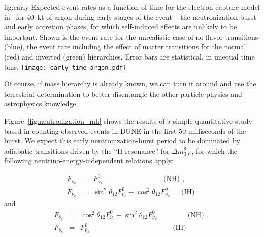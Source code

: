 \begin{dunefigure}{fig:early}
{Expected event rates as a function of time for the electron-capture model in~\cite{Huedepohl:2009wh} for \SI{40}{kt} of argon during early stages of the event -- the neutronization burst and early accretion phases, for which self-induced effects are unlikely to be important.  Shown is the event rate for the unrealistic case of no flavor transitions (blue), the event rate including the effect of matter transitions for the normal (red)  and inverted (green) hierarchies.  Error bars are statistical, in unequal time bins.}
\texttt{[image: early\_time\_argon.pdf]}
\end{dunefigure}

Of course, if mass hierarchy is already known, we can turn it around 
and use the terrestrial determination to better disentangle the other 
particle physics and astrophysics knowledge. 




Figure~\ref{fig:neutronization_mh} shows the results of a simple quantitative study
based in counting observed events in DUNE in the first 50 milliseconds
of the burst.  We expect this early neutronization-burst period to be
dominated by adiabatic  transitions driven by the ``H-resonance''
for $\Delta m^2_{3\ell}$, for which the following
neutrino-energy-independent relations apply:

\begin{eqnarray}  
 F_{\nu_e} &=& F^0_{\nu_x} \,\ \,\ \,\ \,\ \,\ \,\ \,\ \,\  \,\ \,\ \,\ \,\   \,\ \,\  \,\ \,\ \,\ \,\ \,\ \,\  \,\ \,\ \textrm{(NH)} \,\ , \label{eq:msw_nmo}\\
 F_{\nu_e} &=&  \sin^2 \theta_{12} F^0_{\nu_e} +
\cos^2 \theta_{12} F^0_{\nu_x}  \,\ \,\ \,\ \,\ \textrm{(IH)} \,\,
\label{eq:msw_imo}
\end{eqnarray} 
 and 
\begin{eqnarray}  
 F_{\bar\nu_e} &=& \cos^2 \theta_{12} F^0_{\bar\nu_e} + \sin^2 \theta_{12} F^0_{\bar\nu_x}   \,\   \,\ \,\  \,\ \,\ \,\ \,\ \,\ \,\  \,\ \,\ \textrm{(NH)} \,\ , \label{eq:msw_nmo_anti}\\
 F_{\bar\nu_e} &=&   F^0_{\bar\nu_x}  \,\ \,\ \,\ \,\ \,\ \,\ \,\ \,\ \,\ \,\ \,\ \,\ \,\ \,\ \,\ \,\ 
 \,\ \,\ \,\ \,\ \,\ \,\ \,\ \,\ \,\ \,\ \,\ \,\ \,\  \,\
\textrm{(IH)} \,\,\label{eq:msw_imo_anti}
\end{eqnarray} 

